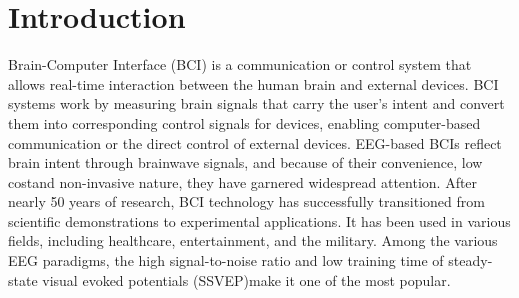 \documentclass[10pt]{iopart}
\begin{document}
\section{Introduction}
Brain-Computer Interface (BCI) is a communication or control system that allows real-time interaction between the human brain and external devices\cite{mak2009clinical}. BCI systems work by measuring brain signals that carry the user's intent and convert them into corresponding control signals for devices, enabling computer-based communication or the direct control of external devices\cite{jiang2020temporal}\cite{xu2021review}\cite{pei2021tensor}. EEG-based BCIs reflect brain intent through brainwave signals, and because of their convenience, low cost\cite{abiri2019comprehensive}and non-invasive nature, they have garnered widespread attention. After nearly 50 years of research, BCI technology has successfully transitioned from scientific demonstrations to experimental applications. It has been used in various fields, including healthcare, entertainment, and the military. Among the various EEG paradigms, the high signal-to-noise ratio and low training time of steady-state visual evoked potentials (SSVEP)\cite{rakshit2020hybrid}\cite{kumar2019designing}\cite{mao2020improve}make it one of the most popular.
\end{document}

